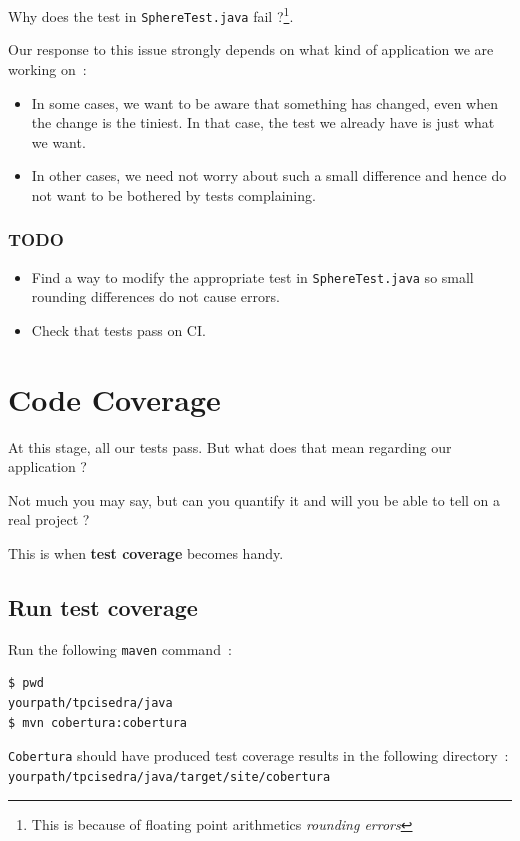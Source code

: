 \documentclass{article}
\begin{document}
Why does the test in \texttt{SphereTest.java} fail ?\footnote{This is because of floating point arithmetics \emph{rounding errors}}.

Our response to this issue strongly depends on what kind of application we are working on~:
\begin{itemize}
\item In some cases, we want to be aware that something has changed, even when the change is the tiniest. In that case, the test we already have is just what we want.
\item In other cases, we need not worry about such a small difference and hence do not want to be bothered by tests complaining.
\end{itemize}

\subsubsection{TODO}
\begin{itemize}
\item Find a way to modify the appropriate test in \texttt{SphereTest.java}
so small rounding differences do not cause errors.
\item Check that tests pass on CI.
\end{itemize}


\section{Code Coverage}

At this stage, all our tests pass. But what does that mean regarding our application ?

Not much you may say, but can you quantify it and will you be able to tell on a real project ?

This is when \textbf{test coverage} becomes handy.

\subsection{Run test coverage}

Run the following \texttt{maven} command~:
\begin{lstlisting}
$ pwd
yourpath/tpcisedra/java
$ mvn cobertura:cobertura
\end{lstlisting}

\texttt{Cobertura} should have produced test coverage results in the following directory~:\\
\texttt{yourpath/tpcisedra/java/target/site/cobertura}
\end{document}
